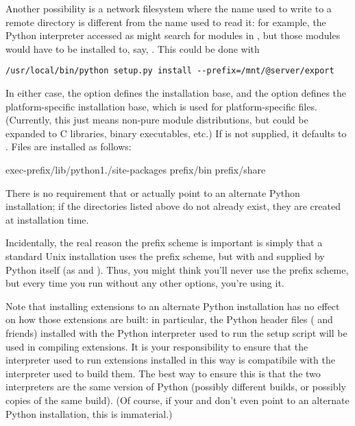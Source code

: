 \documentclass{howto}
\begin{document}
Another possibility is a network filesystem where the name used to write
to a remote directory is different from the name used to read it: for
example, the Python interpreter accessed as 
might search for modules in ,
but those modules would have to be installed to, say,
.  This
could be done with
\begin{verbatim}
/usr/local/bin/python setup.py install --prefix=/mnt/@server/export
\end{verbatim}

In either case, the  option defines the installation
base, and the  option defines the platform-specific
installation base, which is used for platform-specific files.
(Currently, this just means non-pure module distributions, but could be
expanded to C libraries, binary executables, etc.)  If
 is not supplied, it defaults to .
Files are installed as follows:

              {exec-prefix}{/lib/python1./site-packages}
              {prefix}{/bin}
              {prefix}{/share}

There is no requirement that  or 
actually point to an alternate Python installation; if the directories
listed above do not already exist, they are created at installation
time.

Incidentally, the real reason the prefix scheme is important is simply
that a standard Unix installation uses the prefix scheme, but with
 and  supplied by Python itself (as
 and ).  Thus, you might think
you'll never use the prefix scheme, but every time you run  without any other options, you're using it.

Note that installing extensions to an alternate Python installation has
no effect on how those extensions are built: in particular, the Python
header files ( and friends) installed with the Python
interpreter used to run the setup script will be used in compiling
extensions.  It is your responsibility to ensure that the interpreter
used to run extensions installed in this way is compatibile with the
interpreter used to build them.  The best way to ensure this is that the
two interpreters are the same version of Python (possibly different
builds, or possibly copies of the same build).  (Of course, if your
 and  don't even point to an
alternate Python installation, this is immaterial.)
\end{document}
